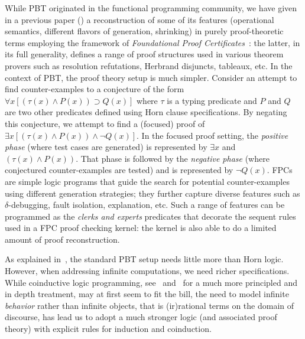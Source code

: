 \documentclass[a4paper]{easychair}
\begin{document}
While PBT originated in the functional programming community, we have
given in a previous paper (\cite{Blanco0M19}) a reconstruction of some
of its features (operational semantics, different flavors of
generation, shrinking) in purely proof-theoretic terms employing the
framework of \emph{Foundational Proof Certificates}~\cite{chihani17jar}: the
latter, in its full generality, defines a range of proof structures
used in various theorem provers such as resolution refutations,
Herbrand disjuncts, tableaux, etc.
%
In the context of PBT, the proof theory setup is much simpler.
Consider an attempt to find counter-examples to a conjecture of the
form \(\forall x [(\tau(x)\wedge P(x)) \supset Q(x)]\) where $\tau$ is
a typing predicate and $P$ and $Q$ are two other predicates defined
using Horn clause specifications.
%
By negating this conjecture, we attempt to find a (focused) proof of 
\(\exists x [(\tau(x)\land P(x)) \land \neg Q(x)]\).
%
In the focused proof setting, the \emph{positive phase} (where
test cases are generated) is represented by \(\exists x\) and
\((\tau(x)\land P(x))\). 
%
That phase is followed by the \emph{negative phase} (where conjectured
counter-examples are tested) and is represented by \(\neg Q(x)\).
%
%
FPCs are simple logic programs that guide the search for potential
counter-examples using different generation strategies; they further
capture diverse features such as $\delta$-debugging, fault isolation,
explanation, etc.  Such a range of features can be
programmed as the \emph{clerks and experts} predicates that decorate
the sequent rules used in a FPC proof checking kernel: the kernel
is also able to do a limited amount of proof reconstruction.

As explained in~\cite{Blanco0M19}, the standard PBT setup needs little
more than Horn logic. %
%
However, when addressing infinite computations, we need richer
specifications.  While coinductive logic programming,
see~\cite{Luke07} and~\cite{BasoldKL19} for a much more principled and
in depth treatment, may at first seem to fit the bill, the need to
model infinite \emph{behavior} rather than infinite objects, that is (ir)rational terms on the
domain of discourse, has lead us to adopt a much stronger logic (and
associated proof theory) with explicit rules for induction and
coinduction.
\end{document}
